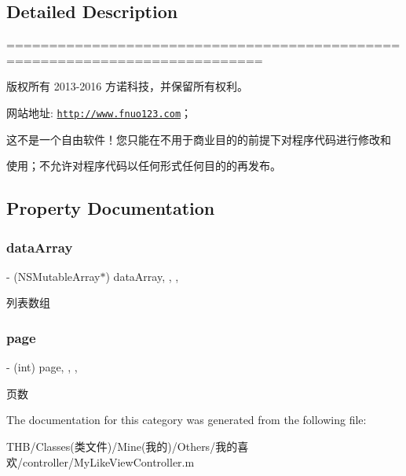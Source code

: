 \subsection{Detailed Description}
============================================================================

版权所有 2013-\/2016 方诺科技，并保留所有权利。

网站地址\+: \href{http://www.fnuo123.com}{\tt http\+://www.\+fnuo123.\+com}； 



这不是一个自由软件！您只能在不用于商业目的的前提下对程序代码进行修改和

使用；不允许对程序代码以任何形式任何目的的再发布。 

 

\subsection{Property Documentation}
\mbox{\label{category_my_like_view_controller_07_08_ae67d4a400a58048f063eb61a319a743b}} 
\subsubsection{\texorpdfstring{data\+Array}{dataArray}}
{\footnotesize\ttfamily -\/ (N\+S\+Mutable\+Array$\ast$) data\+Array\hspace{0.3cm}{\ttfamily [read]}, {\ttfamily [write]}, {\ttfamily [nonatomic]}, {\ttfamily [strong]}}

列表数组 \mbox{\label{category_my_like_view_controller_07_08_a5adb553f5f8524abe1902e293fb7d64a}} 
\subsubsection{\texorpdfstring{page}{page}}
{\footnotesize\ttfamily -\/ (int) page\hspace{0.3cm}{\ttfamily [read]}, {\ttfamily [write]}, {\ttfamily [nonatomic]}, {\ttfamily [assign]}}

页数 

The documentation for this category was generated from the following file\+:\begin{DoxyCompactItemize}
\item 
T\+H\+B/\+Classes(类文件)/\+Mine(我的)/\+Others/我的喜欢/controller/My\+Like\+View\+Controller.\+m\end{DoxyCompactItemize}
